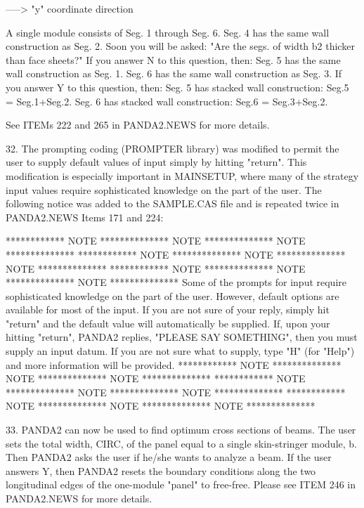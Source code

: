           -----> "y" coordinate direction

       A single module consists of Seg. 1 through Seg. 6.
       Seg. 4 has the same wall construction as Seg. 2.
       Soon you will be asked:
         "Are the segs. of width b2 thicker than face sheets?"
       If you answer N to this question, then:
          Seg. 5 has the same wall construction as Seg. 1.
          Seg. 6 has the same wall construction as Seg. 3.
       If you answer Y to this question, then:
          Seg. 5 has stacked wall construction: Seg.5 = Seg.1+Seg.2.
          Seg. 6 has stacked wall construction: Seg.6 = Seg.3+Seg.2.

See ITEMs 222 and 265 in PANDA2.NEWS for more details.


32. The prompting coding (PROMPTER library) was modified to permit the
user to supply default values of input simply by hitting "return". This
modification is especially important in MAINSETUP, where many of the
strategy input values require sophisticated knowledge on the part of
the user.  The following notice was added to the SAMPLE.CAS file and
is repeated twice in PANDA2.NEWS Items 171 and 224:

 ************ NOTE ************** NOTE ************** NOTE **************
 ************ NOTE ************** NOTE ************** NOTE **************
 ************ NOTE ************** NOTE ************** NOTE **************
 Some of the prompts for input require sophisticated knowledge on the
 part of the user. However, default options are available for most of
 the input. If you are not sure of your reply, simply hit "return" and
 the default value will automatically be supplied. If, upon your hitting
 "return", PANDA2 replies, "PLEASE SAY SOMETHING", then you must supply
 an input datum. If you are not sure what to supply, type "H" (for "Help")
 and more information will be provided.
 ************ NOTE ************** NOTE ************** NOTE **************
 ************ NOTE ************** NOTE ************** NOTE **************
 ************ NOTE ************** NOTE ************** NOTE **************


33. PANDA2 can now be used to find optimum cross sections of beams. The
user sets the total width, CIRC, of the panel equal to a single skin-stringer
module, b. Then PANDA2 asks the user if he/she wants to analyze a beam.
If the user answers Y, then PANDA2 resets the boundary conditions along
the two longitudinal edges of the one-module "panel" to free-free. Please
see ITEM 246 in PANDA2.NEWS for more details.


